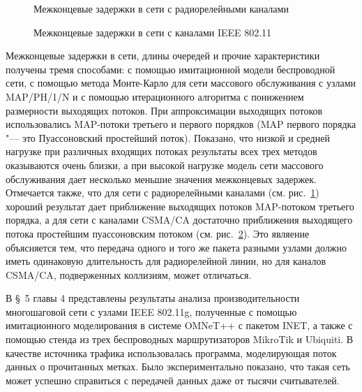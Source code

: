 \begin{figure}[ht!]
  \caption{Межконцевые задержки в сети с радиорелейными каналами}\label{fig:relay_means}
\end{figure}

\begin{figure}[ht!]
  \caption{Межконцевые задержки в сети с каналами IEEE 802.11}\label{fig:dcf_means}
\end{figure}

Межконцевые задержки в сети, длины очередей и прочие характеристики получены тремя способами: с помощью имитационной модели беспроводной сети, с помощью метода Монте-Карло для сети массового обслуживания с узлами MAP/PH/1/N и с помощью итерационного алгоритма с понижением размерности выходящих потоков. При аппроксимации выходящих потоков использовались MAP-потоки третьего и первого порядков (MAP первого порядка "--- это Пуассоновский простейший поток). Показано, что низкой и средней нагрузке при различных входящих потоках результаты всех трех методов оказываются очень близки, а при высокой нагрузке модель сети массового обслуживания дает несколько меньшие значения межконцевых задержек. Отмечается также, что для сети с радиорелейными каналами (см. рис.~\ref{fig:relay_means}) хороший результат дает приближение выходящих потоков MAP-потоком третьего порядка, а для сети с каналами CSMA/CA достаточно приближения выходящего потока простейшим пуассоновским потоком (см. рис.~\ref{fig:dcf_means}). Это являение объясняется тем, что передача одного и того же пакета разными узлами должно иметь одинаковую длительность для радиорелейной линии, но для каналов CSMA/CA, подверженных коллизиям, может отличаться.

В \S~5 главы 4 представлены результаты анализа производительности многошаговой сети с узлами IEEE 802.11g, полученные с помощью имитационного моделирования в системе OMNeT++ с пакетом INET, а также с помощью стенда из трех беспроводных маршрутизаторов MikroTik и Ubiquiti. В качестве источника трафика использовалась программа, моделирующая поток данных о прочитанных метках. Было экспериментально показано, что такая сеть может успешно справиться с передачей данных даже от тысячи считывателей.





